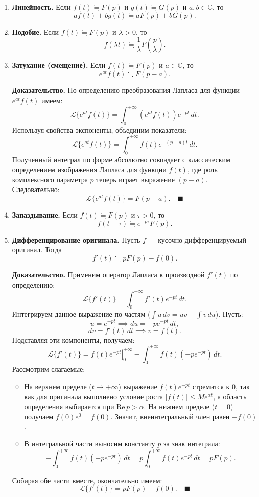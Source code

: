 \documentclass[12pt, a4paper]{article}
\theoremstyle{definition}
\theoremstyle{remark}
\begin{document}
\begin{enumerate}
	\item \textbf{Линейность.} Если $f(t) \fallingdotseq F(p)$ и $g(t) \fallingdotseq G(p)$ и $a, b \in \mathbb{C}$, то
	$$af(t) + bg(t) \fallingdotseq aF(p) + bG(p).$$
	
	\item \textbf{Подобие.} Если $f(t) \fallingdotseq F(p)$ и $\lambda > 0$, то
	$$f(\lambda t) \fallingdotseq \frac{1}{\lambda} F\left(\frac{p}{\lambda}\right).$$
	
	\item \textbf{Затухание (смещение).} Если $f(t) \fallingdotseq F(p)$ и $a \in \mathbb{C}$, то
	$$e^{at} f(t) \fallingdotseq F(p - a).$$
	
	\textbf{Доказательство.} По определению преобразования Лапласа для функции $e^{at}f(t)$ имеем:
	$$\mathcal{L}\{e^{at} f(t)\} = \int_{0}^{+\infty} \left(e^{at} f(t)\right) e^{-pt} \, dt.$$
	Используя свойства экспоненты, объединим показатели:
	$$\mathcal{L}\{e^{at} f(t)\} = \int_{0}^{+\infty} f(t) e^{-(p - a)t} \, dt.$$
	Полученный интеграл по форме абсолютно совпадает с классическим определением изображения Лапласа для функции $f(t)$, где роль комплексного параметра $p$ теперь играет выражение $(p - a)$. Следовательно:
	$$\mathcal{L}\{e^{at} f(t)\} = F(p - a). \quad \blacksquare$$
	
	\item \textbf{Запаздывание.} Если $f(t) \fallingdotseq F(p)$ и $\tau > 0$, то
	$$f(t - \tau) \fallingdotseq e^{-p\tau} F(p).$$
	
	\item \textbf{Дифференцирование оригинала.} Пусть $f$ --- кусочно-дифференцируемый оригинал. Тогда
	$$f'(t) \fallingdotseq pF(p) - f(0).$$
	
	\textbf{Доказательство.} Применим оператор Лапласа к производной $f'(t)$ по определению:
	$$\mathcal{L}\{f'(t)\} = \int_{0}^{+\infty} f'(t) e^{-pt} \, dt.$$
	Интегрируем данное выражение по частям ($\int u \, dv = uv - \int v \, du$). Пусть:
	$$u = e^{-pt} \implies du = -p e^{-pt} \, dt,$$
	$$dv = f'(t) \, dt \implies v = f(t).$$
	Подставляя эти компоненты, получаем:
	$$\mathcal{L}\{f'(t)\} = \left. f(t) e^{-pt} \right|_{0}^{+\infty} - \int_{0}^{+\infty} f(t) \left( -p e^{-pt} \right) \, dt.$$
	Рассмотрим слагаемые:
	\begin{itemize}
		\item На верхнем пределе ($t \to +\infty$) выражение $f(t) e^{-pt}$ стремится к $0$, так как для оригинала выполнено условие роста $|f(t)| \le M e^{\alpha t}$, а область определения выбирается при $\text{Re} \, p > \alpha$. На нижнем пределе ($t = 0$) получаем $f(0)e^0 = f(0)$. Значит, внеинтегральный член равен $-f(0)$.
		\item В интегральной части выносим константу $p$ за знак интеграла: 
		$$-\int_{0}^{+\infty} f(t) \left( -p e^{-pt} \right) \, dt = p \int_{0}^{+\infty} f(t) e^{-pt} \, dt = p F(p).$$
	\end{itemize}
	Собирая обе части вместе, окончательно имеем:
	$$\mathcal{L}\{f'(t)\} = pF(p) - f(0). \quad \blacksquare$$
	

\end{enumerate}
\end{document}

